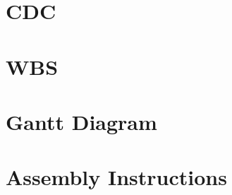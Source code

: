\clearpage\section{CDC}
\begin{minipage}{\textwidth}
    
\end{minipage}


\clearpage\section{WBS}
\begin{minipage}{\textwidth}

\end{minipage}

\clearpage\section{Gantt Diagram}
\begin{minipage}{\textwidth}

\end{minipage}


\clearpage\section{Assembly Instructions}
\begin{minipage}{\textwidth}

\end{minipage}



